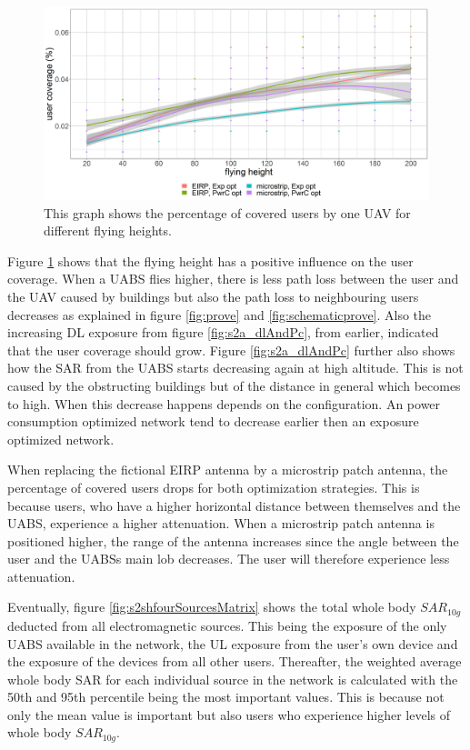 \begin{figure}[h]
  \includegraphics[width=\textwidth]{../results/s2/fhvscov.png}
  \caption{This graph shows the percentage of covered users by one \gls{UAV} for different flying heights.}
  \label{fig:s2fhvscov}
\end{figure}

Figure  \ref{fig:s2fhvscov} shows that the flying height has a positive influence on the user coverage. 
When a \gls{UABS} flies higher, there is less path loss between the user and the \gls{UAV} caused by buildings but also the path loss to neighbouring 
users decreases as explained 
in figure \ref{fig:prove} and \ref{fig:schematicprove}. 
Also the increasing \gls{DL} exposure  from figure \ref{fig:s2a_dlAndPc}, from earlier, indicated that the
user coverage should grow. 
Figure \ref{fig:s2a_dlAndPc} further also shows how the \gls{SAR} from the \gls{UABS}
starts  decreasing again at high altitude. This is  not caused by the obstructing buildings but of the 
distance in general which becomes to high.  When this decrease happens depends on the configuration.  An power consumption optimized 
network tend to decrease earlier then an exposure optimized network.


When replacing the fictional \gls{EIRP} antenna by a microstrip patch antenna, the percentage of covered users drops for both 
optimization strategies. This is because users, who have a higher horizontal distance between themselves and the \gls{UABS}, 
experience a higher attenuation. When a microstrip patch antenna is positioned higher, the range of the antenna increases 
since the angle between the user and the \gls{UABS}s main lob decreases. The user will therefore experience less attenuation.

Eventually, figure \ref{fig:s2shfourSourcesMatrix} shows the total whole body $SAR_{10g}$ deducted from all electromagnetic sources. This being the exposure 
of the only \gls{UABS} available in the network, 
 the \gls{UL} exposure from the user’s own device and the exposure of the devices from all other users. 
 Thereafter, the weighted average whole body \gls{SAR} for each individual source in the network is calculated with the 50th and 95th percentile 
 being the most important values. This is because not only the mean value is important but also users who experience higher 
 levels of whole body $SAR_{10g}$.


